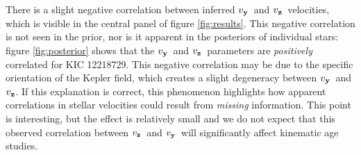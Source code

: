 \documentclass[]{aastex631}
\newcommand{\ie}{{\it i.e.}}
\newcommand{\vy}{$v_{\bf y}$}
\newcommand{\vz}{$v_{\bf z}$}
\newcommand{\kicstar}{12218729}
\begin{document}
There is a slight negative correlation between inferred \vy\ and \vz\
velocities, which is visible in the central panel of figure \ref{fig:results}.
This negative correlation is not seen in the prior, nor is it apparent in the
posteriors of individual stars: figure \ref{fig:posterior} shows that the \vy\
and \vz\ parameters are {\it positively} correlated for KIC \kicstar.
This negative correlation may be due to the specific orientation of the Kepler
field, which creates a slight degeneracy between \vy\ and \vz.
If this explanation is correct, this phenomenon highlights how apparent
correlations in stellar velocities could result from {\it missing}
information.
This point is interesting, but the effect is relatively small and we do not
expect that this observed correlation between \vz\ and \vy\ will significantly
affect kinematic age studies.

\end{document}
